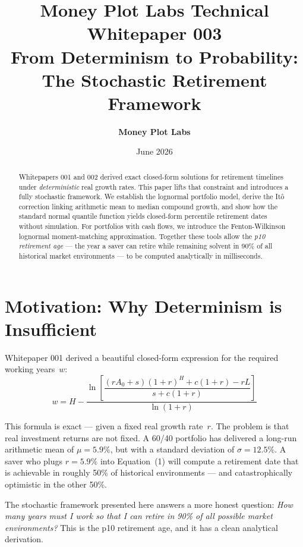 \documentclass[11pt,letterpaper]{article}
\title{\vspace{-20pt}\textbf{\color{mpdark}Money Plot Labs Technical Whitepaper 003 \\
From Determinism to Probability: \\
The Stochastic Retirement Framework}}
\author{\textbf{Money Plot Labs}}
\date{June 2026}
\begin{document}
\maketitle

\begin{abstract}
\vspace{-5pt}
Whitepapers 001 and 002 derived exact closed-form solutions for retirement timelines under \emph{deterministic} real growth rates. This paper lifts that constraint and introduces a fully stochastic framework. We establish the lognormal portfolio model, derive the It\^{o} correction linking arithmetic mean to median compound growth, and show how the standard normal quantile function yields closed-form percentile retirement dates without simulation. For portfolios with cash flows, we introduce the Fenton-Wilkinson lognormal moment-matching approximation. Together these tools allow the \emph{p10 retirement age} --- the year a saver can retire while remaining solvent in 90\% of all historical market environments --- to be computed analytically in milliseconds.
\end{abstract}

\section{Motivation: Why Determinism is Insufficient}

Whitepaper 001 derived a beautiful closed-form expression for the required working years~$w$:
\begin{equation}
w = H - \frac{\ln \!\left[\dfrac{(rA_0 + s)(1+r)^H + c(1+r) - rL}{s + c(1+r)}\right]}{\ln(1+r)}
\end{equation}

This formula is exact --- given a fixed real growth rate~$r$. The problem is that real investment returns are not fixed. A 60/40 portfolio has delivered a long-run arithmetic mean of $\mu = 5.9\%$, but with a standard deviation of $\sigma = 12.5\%$. A saver who plugs $r = 5.9\%$ into Equation~(1) will compute a retirement date that is achievable in roughly 50\% of historical environments --- and catastrophically optimistic in the other 50\%.

The stochastic framework presented here answers a more honest question: \emph{How many years must I work so that I can retire in 90\% of all possible market environments?} This is the p10 retirement age, and it has a clean analytical derivation.
\end{document}
